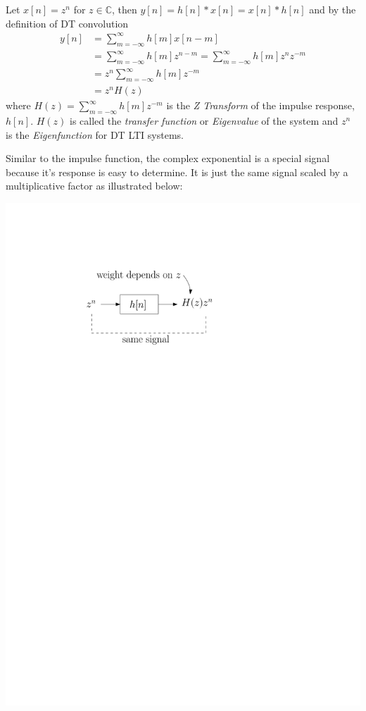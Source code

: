 Let $x[n] = z^n$ for $z\in \mathbb{C}$, then $y[n] = h[n] * x[n] = x[n] * h[n]$ and by the definition of DT convolution
\begin{align*}
  y[n] & = \sum\limits_{m = -\infty}^{\infty}h[m]x[n-m]\\
  &= \sum\limits_{m = -\infty}^{\infty}h[m]z^{n-m} = \sum\limits_{m = -\infty}^{\infty}h[m]z^{n}z^{-m}\\
  &= z^{n} \sum\limits_{m = -\infty}^{\infty}h[m]z^{-m}\\
  &= z^{n}H(z)
\end{align*}
where $H(z) = \sum\limits_{m = -\infty}^{\infty}h[m]z^{-m}$ is the \emph{Z Transform} of the impulse response, $h[n]$. $H(z)$ is called the \emph{transfer function} or \emph{Eigenvalue} of the system and $z^{n}$ is the \emph{Eigenfunction} for DT LTI systems.

Similar to the impulse function, the complex exponential is a special signal because it's response is easy to determine. It is just the same signal scaled by a multiplicative factor as illustrated below:

\begin{center}
  \includegraphics[scale=0.6]{graphics/lti-dt-complex-exp.pdf}
\end{center}


